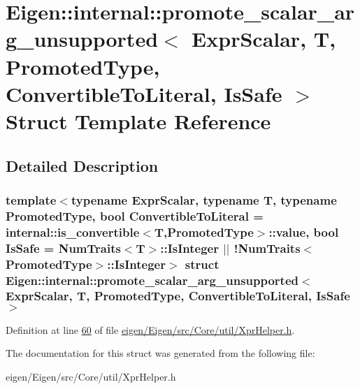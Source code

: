 \hypertarget{struct_eigen_1_1internal_1_1promote__scalar__arg__unsupported}{}\section{Eigen\+:\+:internal\+:\+:promote\+\_\+scalar\+\_\+arg\+\_\+unsupported$<$ Expr\+Scalar, T, Promoted\+Type, Convertible\+To\+Literal, Is\+Safe $>$ Struct Template Reference}
\label{struct_eigen_1_1internal_1_1promote__scalar__arg__unsupported}


\subsection{Detailed Description}
\subsubsection*{template$<$typename Expr\+Scalar, typename T, typename Promoted\+Type, bool Convertible\+To\+Literal = internal\+::is\+\_\+convertible$<$\+T,\+Promoted\+Type$>$\+::value, bool Is\+Safe = Num\+Traits$<$\+T$>$\+::\+Is\+Integer $\vert$$\vert$ !\+Num\+Traits$<$\+Promoted\+Type$>$\+::\+Is\+Integer$>$\newline
struct Eigen\+::internal\+::promote\+\_\+scalar\+\_\+arg\+\_\+unsupported$<$ Expr\+Scalar, T, Promoted\+Type, Convertible\+To\+Literal, Is\+Safe $>$}



Definition at line \hyperlink{eigen_2_eigen_2src_2_core_2util_2_xpr_helper_8h_source_l00060}{60} of file \hyperlink{eigen_2_eigen_2src_2_core_2util_2_xpr_helper_8h_source}{eigen/\+Eigen/src/\+Core/util/\+Xpr\+Helper.\+h}.



The documentation for this struct was generated from the following file\+:\begin{DoxyCompactItemize}
\item 
eigen/\+Eigen/src/\+Core/util/\+Xpr\+Helper.\+h\end{DoxyCompactItemize}
